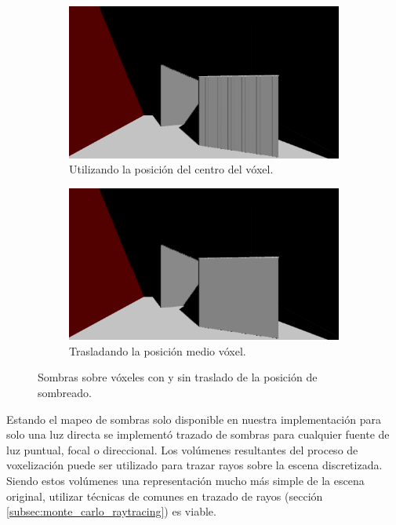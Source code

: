\begin{figure}[H]
	\centering
	\begin{subfigure}[t]{0.49\textwidth}
		\centering
		\captionsetup{justification=centering}
		\includegraphics[width=\linewidth]{media/no_translation.png}
		\caption*{Utilizando la posición del centro del vóxel.}
	\end{subfigure}%
	\hspace{0.01\textwidth}
	\begin{subfigure}[t]{0.49\textwidth}
		\centering
		\captionsetup{justification=centering}
		\includegraphics[width=\linewidth]{media/with_translation.png}
		\caption*{Trasladando la posición medio vóxel.}
	\end{subfigure}%
	\caption{Sombras sobre vóxeles con y sin traslado de la posición de sombreado.}
	\label{fig:voxel_shadow_translate}
\end{figure}

Estando el mapeo de sombras solo disponible en nuestra implementación para solo una luz directa se implementó trazado de sombras para cualquier fuente de luz puntual, focal o direccional. Los volúmenes resultantes del proceso de voxelización puede ser utilizado para trazar rayos sobre la escena discretizada. Siendo estos volúmenes una representación mucho más simple de la escena original, utilizar técnicas de comunes en trazado de rayos (sección \ref{subsec:monte_carlo_raytracing}) es viable.

